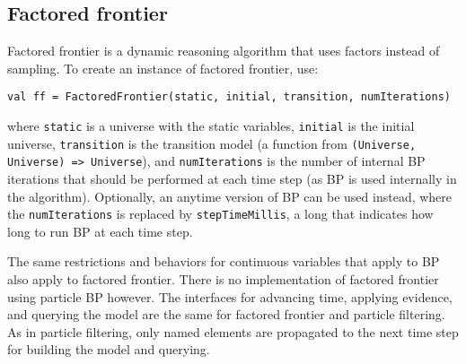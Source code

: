 \subsection{Factored frontier}

Factored frontier is a dynamic reasoning algorithm that uses factors instead of sampling. To create an instance of factored frontier, use:

\begin{flushleft}
\texttt{val ff = FactoredFrontier(static, initial, transition, numIterations)}
\end{flushleft}

where \texttt{static} is a universe with the static variables, \texttt{initial} is the initial universe, \texttt{transition} is the transition model (a function from \texttt{(Universe, Universe) => Universe}), and \texttt{numIterations} is the number of internal BP iterations that should be performed at each time step (as BP is used internally in the algorithm). Optionally, an anytime version of BP can be used instead, where the \texttt{numIterations} is replaced by \texttt{stepTimeMillis}, a long that indicates how long to run BP at each time step.

The same restrictions and behaviors for continuous variables that apply to BP also apply to factored frontier. There is no implementation of factored frontier using particle BP however. The interfaces for advancing time, applying evidence, and querying the model are the same for factored frontier and particle filtering. As in particle filtering, only named elements are propagated to the next time step for building the model and querying.

